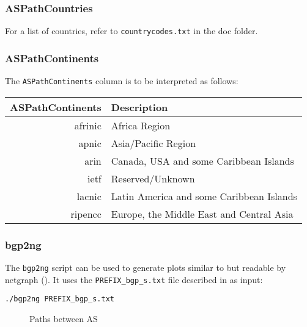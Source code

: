 \documentclass[documentation]{subfiles}
\begin{document}
\subsubsection{ASPathCountries}\label{ASPathCountries}
For a list of countries, refer to {\tt countrycodes.txt} in the doc folder.

\subsubsection{ASPathContinents}\label{ASPathContinents}
The {\tt ASPathContinents} column is to be interpreted as follows:

\begin{minipage}{0.6\textwidth}
\begin{longtable}{rl}
    \toprule
    {\bf ASPathContinents} & {\bf Description}\\
    \midrule\endhead%
    afrinic & Africa Region\\
    apnic   & Asia/Pacific Region\\
    arin    & Canada, USA and some Caribbean Islands\\
    ietf    & Reserved/Unknown\\
    lacnic  & Latin America and some Caribbean Islands\\
    ripencc & Europe, the Middle East and Central Asia\\
    \bottomrule
\end{longtable}
\end{minipage}
\hfill
\begin{minipage}{0.3\textwidth}
    \vspace{1.3cm}
\end{minipage}

\clearpage

\subsubsection{bgp2ng}\label{bgp2ng}
The {\tt bgp2ng} script can be used to generate plots similar to {\tt{}} but readable by netgraph ().
It uses the {\tt PREFIX\_bgp\_s.txt} file described in  as input:
\begin{lstlisting}
./bgp2ng PREFIX_bgp_s.txt
\end{lstlisting}

\begin{figure}[!ht]
    \centering
    \caption{Paths between AS}
    \label{fig:bgpng}
\end{figure}
\end{document}
